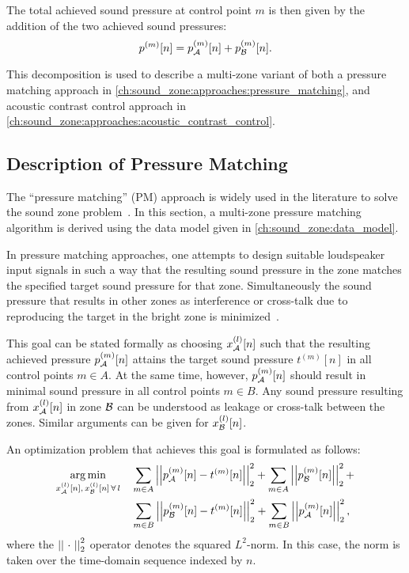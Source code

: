 The total achieved sound pressure at control point $m$ is then given by the addition of the two achieved sound pressures:
\begin{equation}
    p^{(m)}[n] = p_{\mathcal{A}}^{(m)}[n] + p_{\mathcal{B}}^{(m)}[n].
\end{equation}

This decomposition is used to describe a multi-zone variant of both a pressure matching approach 
in \autoref{ch:sound_zone:approaches:pressure_matching},
and acoustic contrast control approach in \autoref{ch:sound_zone:approaches:acoustic_contrast_control}.

\subsection{Description of Pressure Matching}
\label{ch:sound_zone:approaches:pressure_matching}
The ``pressure matching'' (PM) approach is widely used in the literature to 
solve the sound zone problem~\cite{betlehem2015personal, moller2016sound}.
In this section, a multi-zone pressure matching algorithm is derived using the data model 
given in \autoref{ch:sound_zone:data_model}.

In pressure matching approaches, one attempts to design suitable loudspeaker input signals in such a way that the resulting sound pressure in the zone matches the specified target sound pressure for that zone. 
Simultaneously the sound pressure that results in other zones as interference or cross-talk due to reproducing the target in the bright zone is minimized~\cite{betlehem2015personal, olik2013comparative}.

This goal can be stated formally as choosing $x_{\mathcal{A}}^{(l)}[n]$ such that the resulting achieved pressure 
$p_{\mathcal{A}}^{(m)}[n]$ attains the target sound pressure $t^{(m)}[n]$ in all control points $m \in A$.   
At the same time, however, $p_{\mathcal{A}}^{(m)}[n]$ should result in minimal sound pressure in all control points $m \in B$.
Any sound pressure resulting from $x_{\mathcal{A}}^{(l)}[n]$ in zone $\mathcal{B}$ can be understood as leakage or cross-talk between the zones. 
Similar arguments can be given for $x_{\mathcal{B}}^{(l)}[n]$.

An optimization problem that achieves this goal is formulated as follows:
\begin{align}
    \begin{aligned}
        \argmin{x_\za^{(l)}[n],\,x_\zb^{(l)}[n]\,\forall\,l}{
           &\sum_{m\in A} \norm[2][2]{p_\za^{(m)}[n] - t^{(m)}[n]} +
            \sum_{m\in A} \norm[2][2]{p_\zb^{(m)}[n]} + \\
           &\sum_{m\in B} \norm[2][2]{p_\zb^{(m)}[n] - t^{(m)}[n]} + 
            \sum_{m\in B} \norm[2][2]{p_\za^{(m)}[n]}
        },
    \end{aligned}
\end{align}
where the $\norm[2][2]{\,\,\cdot\,\,}$ operator denotes the squared $L^2$-norm.
In this case, the norm is taken over the time-domain sequence indexed by $n$.

